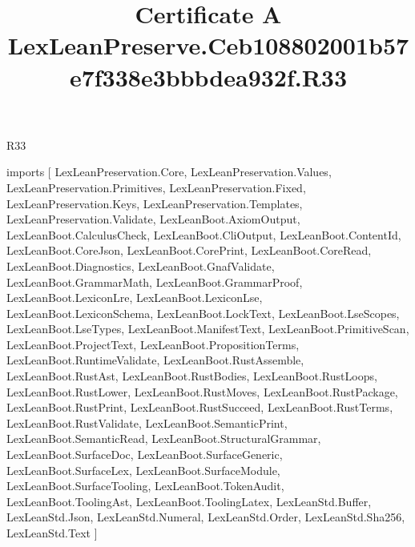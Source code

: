 \begin{lexlean}{R33}
\title{Certificate A LexLeanPreserve.Ceb108802001b57e7f338e3bbbdea932f.R33}
\begin{coremodule}
imports [
  LexLeanPreservation.Core,
  LexLeanPreservation.Values,
  LexLeanPreservation.Primitives,
  LexLeanPreservation.Fixed,
  LexLeanPreservation.Keys,
  LexLeanPreservation.Templates,
  LexLeanPreservation.Validate,
  LexLeanBoot.AxiomOutput,
  LexLeanBoot.CalculusCheck,
  LexLeanBoot.CliOutput,
  LexLeanBoot.ContentId,
  LexLeanBoot.CoreJson,
  LexLeanBoot.CorePrint,
  LexLeanBoot.CoreRead,
  LexLeanBoot.Diagnostics,
  LexLeanBoot.GnafValidate,
  LexLeanBoot.GrammarMath,
  LexLeanBoot.GrammarProof,
  LexLeanBoot.LexiconLre,
  LexLeanBoot.LexiconLse,
  LexLeanBoot.LexiconSchema,
  LexLeanBoot.LockText,
  LexLeanBoot.LseScopes,
  LexLeanBoot.LseTypes,
  LexLeanBoot.ManifestText,
  LexLeanBoot.PrimitiveScan,
  LexLeanBoot.ProjectText,
  LexLeanBoot.PropositionTerms,
  LexLeanBoot.RuntimeValidate,
  LexLeanBoot.RustAssemble,
  LexLeanBoot.RustAst,
  LexLeanBoot.RustBodies,
  LexLeanBoot.RustLoops,
  LexLeanBoot.RustLower,
  LexLeanBoot.RustMoves,
  LexLeanBoot.RustPackage,
  LexLeanBoot.RustPrint,
  LexLeanBoot.RustSucceed,
  LexLeanBoot.RustTerms,
  LexLeanBoot.RustValidate,
  LexLeanBoot.SemanticPrint,
  LexLeanBoot.SemanticRead,
  LexLeanBoot.StructuralGrammar,
  LexLeanBoot.SurfaceDoc,
  LexLeanBoot.SurfaceGeneric,
  LexLeanBoot.SurfaceLex,
  LexLeanBoot.SurfaceModule,
  LexLeanBoot.SurfaceTooling,
  LexLeanBoot.TokenAudit,
  LexLeanBoot.ToolingAst,
  LexLeanBoot.ToolingLatex,
  LexLeanStd.Buffer,
  LexLeanStd.Json,
  LexLeanStd.Numeral,
  LexLeanStd.Order,
  LexLeanStd.Sha256,
  LexLeanStd.Text
]


\end{coremodule}
\end{lexlean}
